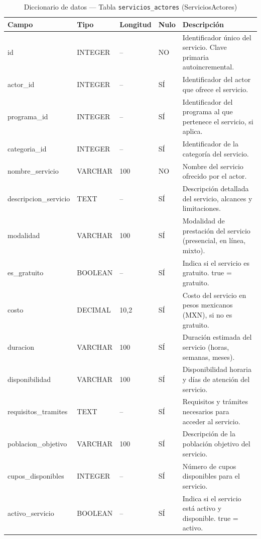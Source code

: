 \begin{table}[H]
	\centering
	\caption{Diccionario de datos --- Tabla \texttt{servicios\_actores} (ServiciosActores)}
	\label{tab:data-dict-servicios_actores}
	\scriptsize
	\begin{tabular}{>{\ttfamily\raggedright\arraybackslash}p{3.6cm} p{1.6cm} p{1.3cm} p{0.7cm} p{5.6cm}}
		\toprule
		\textbf{Campo} & \textbf{Tipo} & \textbf{Longitud} & \textbf{Nulo} & \textbf{Descripción} \\
		\midrule
		id & INTEGER & -- & NO & Identificador único del servicio. Clave primaria autoincremental. \\
		actor\_id & INTEGER & -- & SÍ & Identificador del actor que ofrece el servicio. \\
		programa\_id & INTEGER & -- & SÍ & Identificador del programa al que pertenece el servicio, si aplica. \\
		categoria\_id & INTEGER & -- & SÍ & Identificador de la categoría del servicio. \\
		nombre\_servicio & VARCHAR & 100 & NO & Nombre del servicio ofrecido por el actor. \\
		descripcion\_servicio & TEXT & -- & SÍ & Descripción detallada del servicio, alcances y limitaciones. \\
		modalidad & VARCHAR & 100 & SÍ & Modalidad de prestación del servicio (presencial, en línea, mixto). \\
		es\_gratuito & BOOLEAN & -- & SÍ & Indica si el servicio es gratuito. true = gratuito. \\
		costo & DECIMAL & 10,2 & SÍ & Costo del servicio en pesos mexicanos (MXN), si no es gratuito. \\
		duracion & VARCHAR & 100 & SÍ & Duración estimada del servicio (horas, semanas, meses). \\
		disponibilidad & VARCHAR & 100 & SÍ & Disponibilidad horaria y días de atención del servicio. \\
		requisitos\_tramites & TEXT & -- & SÍ & Requisitos y trámites necesarios para acceder al servicio. \\
		poblacion\_objetivo & VARCHAR & 100 & SÍ & Descripción de la población objetivo del servicio. \\
		cupos\_disponibles & INTEGER & -- & SÍ & Número de cupos disponibles para el servicio. \\
		activo\_servicio & BOOLEAN & -- & SÍ & Indica si el servicio está activo y disponible. true = activo. \\
		\bottomrule
	\end{tabular}
\end{table}

